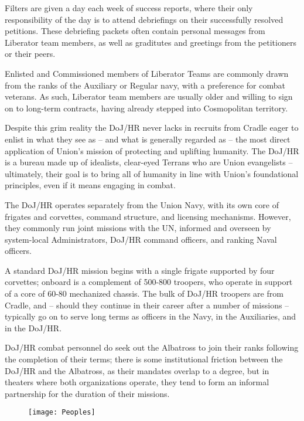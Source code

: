 Filters are given a day each week of success reports, where their only responsibility of the day is
to attend debriefings on their successfully resolved petitions. These debriefing packets often
contain personal messages from Liberator team members, as well as graditutes and greetings
from the petitioners or their peers.

Enlisted and Commissioned members of Liberator Teams are commonly drawn from the ranks of
the Auxiliary or Regular navy, with a preference for combat veterans. As such, Liberator team
members are usually older and willing to sign on to long-term contracts, having already stepped
into Cosmopolitan territory.

Despite this grim reality the DoJ/HR never lacks in recruits from Cradle eager to enlist in what
they see as -- and what is generally regarded as -- the most direct application of Union's mission
of protecting and uplifting humanity. The DoJ/HR is a bureau made up of idealists, clear-eyed
Terrans who are Union evangelists -- ultimately, their goal is to bring all of humanity in line with
Union's foundational principles, even if it means engaging in combat.

The DoJ/HR operates separately from the Union Navy, with its own core of frigates and corvettes,
command structure, and licensing mechanisms. However, they commonly run joint missions with
the UN, informed and overseen by system-local Administrators, DoJ/HR command officers, and
ranking Naval officers.

A standard DoJ/HR mission begins with a single frigate supported by four corvettes; onboard is a
complement of 500-800 troopers, who operate in support of a core of 60-80 mechanized chassis.
The bulk of DoJ/HR troopers are from Cradle, and -- should they continue in their career after a
number of missions -- typically go on to serve long terms as officers in the Navy, in the Auxiliaries,
and in the DoJ/HR.

DoJ/HR combat personnel do seek out the Albatross to join their ranks following the completion of
their terms; there is some institutional friction between the DoJ/HR and the Albatross, as their
mandates overlap to a degree, but in theaters where both organizations operate, they tend to form
an informal partnership for the duration of their missions.

\begin{figure}\begin{center}
  \texttt{[image: Peoples]}
\end{center}\end{figure}
